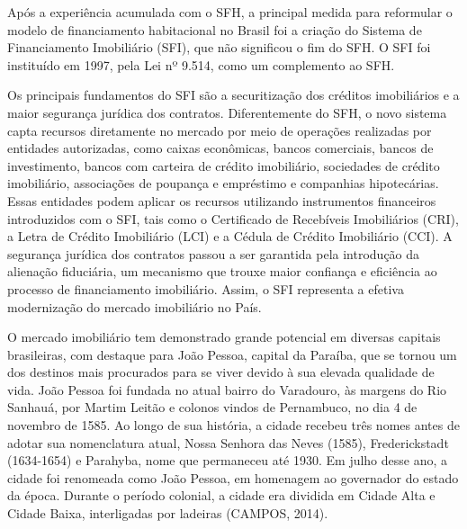 \documentclass[
  12pt,
  a4paper,
]{scrreprt}
\begin{document}
\vspace{12pt}

Após a experiência acumulada com o SFH, a principal medida para
reformular o modelo de financiamento habitacional no Brasil foi a
criação do Sistema de Financiamento Imobiliário (SFI), que não
significou o fim do SFH. O SFI foi instituído em 1997, pela Lei nº
9.514, como um complemento ao SFH.

\vspace{12pt}

Os principais fundamentos do SFI são a securitização dos créditos
imobiliários e a maior segurança jurídica dos contratos. Diferentemente
do SFH, o novo sistema capta recursos diretamente no mercado por meio de
operações realizadas por entidades autorizadas, como caixas econômicas,
bancos comerciais, bancos de investimento, bancos com carteira de
crédito imobiliário, sociedades de crédito imobiliário, associações de
poupança e empréstimo e companhias hipotecárias. Essas entidades podem
aplicar os recursos utilizando instrumentos financeiros introduzidos com
o SFI, tais como o Certificado de Recebíveis Imobiliários (CRI), a Letra
de Crédito Imobiliário (LCI) e a Cédula de Crédito Imobiliário (CCI). A
segurança jurídica dos contratos passou a ser garantida pela introdução
da alienação fiduciária, um mecanismo que trouxe maior confiança e
eficiência ao processo de financiamento imobiliário. Assim, o SFI
representa a efetiva modernização do mercado imobiliário no País.

\vspace{12pt}

O mercado imobiliário tem demonstrado grande potencial em diversas
capitais brasileiras, com destaque para João Pessoa, capital da Paraíba,
que se tornou um dos destinos mais procurados para se viver devido à sua
elevada qualidade de vida. João Pessoa foi fundada no atual bairro do
Varadouro, às margens do Rio Sanhauá, por Martim Leitão e colonos vindos
de Pernambuco, no dia 4 de novembro de 1585. Ao longo de sua história, a
cidade recebeu três nomes antes de adotar sua nomenclatura atual, Nossa
Senhora das Neves (1585), Frederickstadt (1634-1654) e Parahyba, nome
que permaneceu até 1930. Em julho desse ano, a cidade foi renomeada como
João Pessoa, em homenagem ao governador do estado da época. Durante o
período colonial, a cidade era dividida em Cidade Alta e Cidade Baixa,
interligadas por ladeiras (CAMPOS, 2014).

\vspace{12pt}
\end{document}
